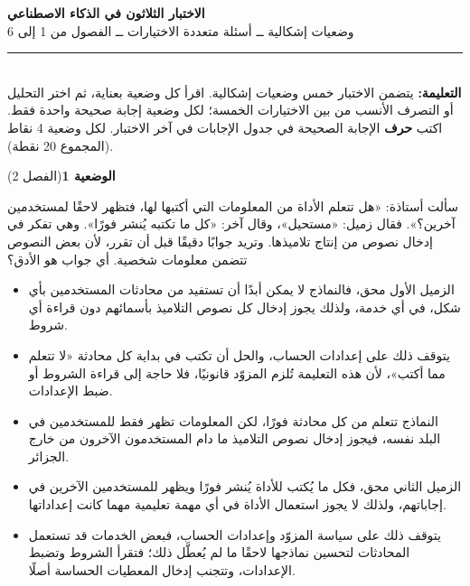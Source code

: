 \documentclass[11pt,a4paper]{article}
\begin{document}
\linespread{1.08}\selectfont
\begin{center}
{\LARGE\khatt\textbf{الاختبار الثلاثون في الذكاء الاصطناعي}}\\[4pt]
{\normalsize وضعيات إشكالية ــ أسئلة متعددة الاختيارات ــ الفصول من 1 إلى 6}
\end{center}
\vspace{-2pt}\rule{\textwidth}{0.6pt}\\[2pt]
\textbf{التعليمة:} يتضمن الاختبار خمس وضعيات إشكالية. اقرأ كل وضعية بعناية، ثم اختر التحليل أو التصرف الأنسب
من بين الاختيارات الخمسة؛ لكل وضعية إجابة صحيحة واحدة فقط.
اكتب \textbf{حرف} الإجابة الصحيحة في جدول الإجابات في آخر الاختبار.
لكل وضعية 4 نقاط (المجموع 20 نقطة).
\vspace{4pt}

\noindent
{\large\khatt\textbf{الوضعية 1}}\hfill{\small(الفصل 2)}\par\nopagebreak\vspace{3pt}
\setlength{\fboxsep}{7pt}\colorbox{gray!10}{\parbox{\dimexpr\linewidth-14pt}{سألت أستاذة: «هل تتعلم الأداة من المعلومات التي أكتبها لها، فتظهر لاحقًا لمستخدمين آخرين؟». فقال زميل: «مستحيل»، وقال آخر: «كل ما تكتبه يُنشر فورًا». وهي تفكر في إدخال نصوص من إنتاج تلاميذها. وتريد جوابًا دقيقًا قبل أن تقرر، لأن بعض النصوص تتضمن معلومات شخصية. أي جواب هو الأدق؟}}\par\nopagebreak
\begin{itemize}[leftmargin=1.0cm, labelsep=6pt, itemsep=3pt, topsep=4pt, parsep=0pt]
  \item[\textbf{أ)}] الزميل الأول محق، فالنماذج لا يمكن أبدًا أن تستفيد من محادثات المستخدمين بأي شكل، في أي خدمة، ولذلك يجوز إدخال كل نصوص التلاميذ بأسمائهم دون قراءة أي شروط.
  \item[\textbf{ب)}] يتوقف ذلك على إعدادات الحساب، والحل أن تكتب في بداية كل محادثة «لا تتعلم مما أكتب»، لأن هذه التعليمة تُلزم المزوّد قانونيًا، فلا حاجة إلى قراءة الشروط أو ضبط الإعدادات.
  \item[\textbf{ج)}] النماذج تتعلم من كل محادثة فورًا، لكن المعلومات تظهر فقط للمستخدمين في البلد نفسه، فيجوز إدخال نصوص التلاميذ ما دام المستخدمون الآخرون من خارج الجزائر.
  \item[\textbf{د)}] الزميل الثاني محق، فكل ما يُكتب للأداة يُنشر فورًا ويظهر للمستخدمين الآخرين في إجاباتهم، ولذلك لا يجوز استعمال الأداة في أي مهمة تعليمية مهما كانت إعداداتها.
  \item[\textbf{هـ)}] يتوقف ذلك على سياسة المزوّد وإعدادات الحساب، فبعض الخدمات قد تستعمل المحادثات لتحسين نماذجها لاحقًا ما لم يُعطَّل ذلك؛ فتقرأ الشروط وتضبط الإعدادات، وتتجنب إدخال المعطيات الحساسة أصلًا.
\end{itemize}
\end{document}
